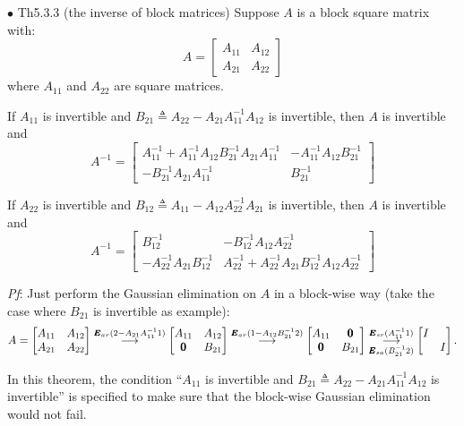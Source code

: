 \documentclass{article}
\begin{document}
\begin{Th}{$\bullet$ Th5.3.3 (the inverse of block matrices)}
    Suppose $A$ is a block square matrix with:
    $$
    A = \begin{bmatrix}
        A_{11} & A_{12}\\
        A_{21} & A_{22}
    \end{bmatrix}
    $$
    where $A_{11}$ and $A_{22}$ are square matrices. 
    \begin{compactenum}
        \item If $A_{11}$ is invertible and $B_{21}\triangleq A_{22}-A_{21}A_{11}^{-1}A_{12}$ is invertible, then $A$ is invertible and
            $$
            A^{-1} = \begin{bmatrix}
                A_{11}^{-1} + A_{11}^{-1}A_{12}B_{21}^{-1}A_{21}A_{11}^{-1} & -A_{11}^{-1}A_{12}B_{21}^{-1}\\
                -B_{21}^{-1}A_{21}A_{11}^{-1} & B_{21}^{-1}
            \end{bmatrix}
            $$
        \item If $A_{22}$ is invertible and $B_{12}\triangleq A_{11}-A_{12}A_{22}^{-1}A_{21}$ is invertible, then $A$ is invertible and
            $$
            A^{-1} = \begin{bmatrix}
                B_{12}^{-1} & -B_{12}^{-1}A_{12}A_{22}^{-1}\\
                -A_{22}^{-1}A_{21}B_{12}^{-1} & A_{22}^{-1}+A_{22}^{-1}A_{21}B_{12}^{-1}A_{12}A_{22}^{-1}
            \end{bmatrix}
            $$
    \end{compactenum}
    \tcblower
    \textit{Pf}: Just perform the Gaussian elimination on $A$ in a block-wise way (take the case where $B_{21}$ is invertible as example):
    $$ A = \begin{bmatrix}
        A_{11} & A_{12}\\
        A_{21} & A_{22}
    \end{bmatrix} 
    \overset{\pmb{E}_{ar}(2-A_{21}A_{11}^{-1}1)}{\longrightarrow}
    \begin{bmatrix}
        A_{11} & A_{12}\\
        \pmb{0} & B_{21}
    \end{bmatrix}
    \overset{\pmb{E}_{ar}(1-A_{12}B_{21}^{-1}2)}{\longrightarrow}
    \begin{bmatrix}
        A_{11} & \pmb{0}\\
        \pmb{0} & B_{21}
    \end{bmatrix}
    \overunderset{\pmb{E}_{sr}(A_{11}^{-1}1)}{\pmb{E}_{sa}(B_{21}^{-1}2)}{\longrightarrow}
    \begin{bmatrix}
        I & \\
        & I
    \end{bmatrix}.
    $$
\end{Th}

\begin{Rmk}{}
    In this theorem, the condition ``$A_{11}$ is invertible and $B_{21}\triangleq A_{22}-A_{21}A_{11}^{-1}A_{12}$ is invertible'' is specified to make sure that the block-wise Gaussian elimination would not fail.
\end{Rmk}
\end{document}
